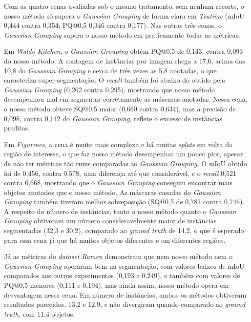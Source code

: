 Com as quatro cenas avaliadas sob o mesmo tratamento, sem nenhum recorte, o nosso método só supera o \textit{Gaussian Grouping} de forma clara em \textit{Teatime} (mIoU 0,444 contra 0,354; PQ@0,5 0,346 contra 0,177). Nas outras três cenas, o \textit{Gaussian Grouping} supera o nosso método em praticamente todas as métricas.


Em \textit{Waldo Kitchen}, o \textit{Gaussian Grouping} obtém PQ@0,5 de 0,143, contra 0,093 do nosso método. A contagem de instâncias por imagem chega a 17,6, acima das 10,8 do \textit{Gaussian Grouping} e cerca de três vezes as 5,8 anotadas, o que caracteriza super-segmentação. O \textit{recall} também foi abaixo do obtido pelo \textit{Gaussian Grouping} (0,262 contra 0,295), mostrando que nosso método desempenhou mal em segmentar corretamente as máscaras anotadas. Nessa cena, o nosso método obteve SQ@0,5 maior (0,660 contra 0,634), mas a precisão de 0,098, contra 0,142 do \textit{Gaussian Grouping}, reflete o excesso de instâncias preditas.

Em \textit{Figurines}, a cena é muito mais complexa e há muitas \emph{splats} em volta da região de interesse, o que faz nosso método desempenhar um pouco pior, apesar de não ter métricas tão ruins comparadas ao \textit{Gaussian Grouping}. O mIoU obtido foi de 0,456, contra 0,578, uma diferença até que considerável, e o \textit{recall} 0,521 contra 0,668, mostrando que o \textit{Gaussian Grouping} conseguiu encontrar mais objetos anotados que o nosso método. As máscaras casadas do \textit{Gaussian Grouping} também tiveram melhor sobreposição (SQ@0,5 de 0,781 contra 0,746). A respeito do número de instâncias, tanto o nosso método quanto o \textit{Gaussian Grouping} obtiveram um número consideravelmente maior de instâncias segmentadas (32,3 e 30,2), comparado ao \textit{ground truth} de 14,2, o que é esperado para essa cena já que há muitos objetos diferentes e em diferentes regiões. 

Já as métricas do \textit{dataset Ramen} demonstram que nem nosso método nem o \textit{Gaussian Grouping} operaram bem na segmentação, com valores baixos de mIoU comparados aos outros experimentos (0,193 e 0,249), e também com valores de PQ@0,5 menores (0,111 e 0,194), mas ainda assim, nosso método opera em desvantagem nessa cena. Em número de instâncias, ambos os métodos obtiveram resultados parecidos, 13,2 e 12,9, e não divergiram quando comparado ao \textit{ground truth}, com 11,4 objetos.


